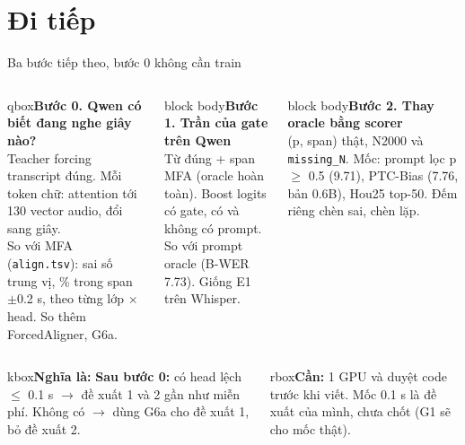 \documentclass[aspectratio=169,xcolor=table]{beamer}
\newcommand{\ra}{$\rightarrow$}
\newcommand{\bsz}{\footnotesize}%
\newcommand{\nbox}[2][block body]{\begin{beamercolorbox}[sep=0.45em,rounded=true]{#1}\bsz #2\end{beamercolorbox}}
\newcommand{\nghiala}[1]{\begin{beamercolorbox}[sep=0.32em,rounded=true]{kbox}\bsz\textbf{Nghĩa là:} #1\end{beamercolorbox}}
\newcommand{\yeu}[1]{\begin{beamercolorbox}[sep=0.40em,rounded=true]{rbox}\bsz #1\end{beamercolorbox}}
\begin{document}
\section{Đi tiếp}
\begin{frame}{Ba bước tiếp theo, bước 0 không cần train}
\begin{columns}[T]
\nbox[qbox]{\textbf{Bước 0. Qwen có biết đang nghe giây nào?}\\[2pt]
Teacher forcing transcript đúng. Mỗi token chữ: attention tới 130 vector audio, đổi sang giây.\\[2pt]
So với MFA (\texttt{align.tsv}): sai số trung vị, \% trong span $\pm$0.2 s, theo từng lớp $\times$ head. So thêm ForcedAligner, G6a.}
\nbox{\textbf{Bước 1. Trần của gate trên Qwen}\\[2pt]
Từ đúng + span MFA (oracle hoàn toàn). Boost logits có gate, có và không có prompt.\\[2pt]
So với prompt oracle (B-WER 7.73). Giống E1 trên Whisper.}
\nbox{\textbf{Bước 2. Thay oracle bằng scorer}\\[2pt]
(p, span) thật, N2000 và \texttt{missing\_N}. Mốc: prompt lọc p $\geq$ 0.5 (9.71), PTC-Bias (7.76, bản 0.6B), Hou25 top-50. Đếm riêng chèn sai, chèn lặp.}
\end{columns}
\vspace{0.12cm}
\begin{columns}[T]
\nghiala{\textbf{Sau bước 0:} có head lệch $\leq$ 0.1 s \ra{} đề xuất 1 và 2 gần như miễn phí. Không có \ra{} dùng G6a cho đề xuất 1, bỏ đề xuất 2.}
\yeu{\textbf{Cần:} 1 GPU và duyệt code trước khi viết. Mốc 0.1 s là đề xuất của mình, chưa chốt (G1 sẽ cho mốc thật).}
\end{columns}
\end{frame}
\end{document}
